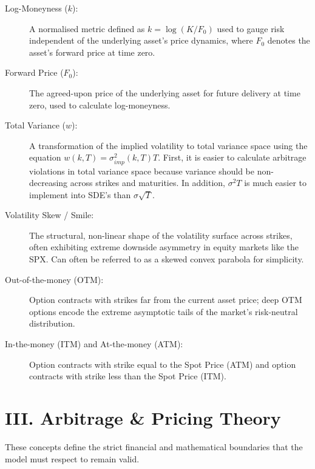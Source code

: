 \documentclass[12pt,oneside]{report}
\theoremstyle{definition}
\theoremstyle{remark}
\begin{document}
\begin{description}
    \item[Log-Moneyness ($k$):] A normalised metric defined as $k = \log(K/F_0)$ used to gauge risk independent of the underlying asset's price dynamics, where $F_0$ denotes the asset’s forward price at time zero.
    \item[Forward Price ($F_0$):] The agreed-upon price of the underlying asset for future delivery at time zero, used to calculate log-moneyness.
    \item[Total Variance ($w$):] A transformation of the implied volatility to total variance space using the equation $w(k, T) = \sigma_{imp}^2(k, T)T$. First, it is easier to calculate arbitrage violations in total variance space because variance should be non-decreasing across strikes and maturities. In addition, $\sigma^2T$ is much easier to implement into SDE's than $\sigma \sqrt{T}$.
    \item[Volatility Skew / Smile:] The structural, non-linear shape of the volatility surface across strikes, often exhibiting extreme downside asymmetry in equity markets like the SPX. Can often be referred to as a skewed convex parabola for simplicity.
    \item[Out-of-the-money (OTM):] Option contracts with strikes far from the current asset price; deep OTM options encode the extreme asymptotic tails of the market's risk-neutral distribution.
    \item[In-the-money (ITM) and At-the-money (ATM):] Option contracts with strike equal to the Spot Price (ATM) and option contracts with strike less than the Spot Price (ITM).
\end{description}

\newpage
\section*{III. Arbitrage \& Pricing Theory}
{}
\label{sec:glossary_arbitrage_pricing_theory}
These concepts define the strict financial and mathematical boundaries that the model must respect to remain valid.
\end{document}
